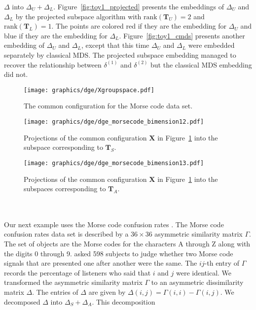 $\Delta$ into $\Delta_U + \Delta_L$. Figure~\ref{fig:toy1_projected}
presents the embeddings of $\Delta_U$ and $\Delta_L$
by the projected subspace algorithm with $\mathrm{rank}(\mathbf{T}_U)
= 2$ and $\mathrm{rank}(\mathbf{T}_L) = 1$. The points are colored red
if they are the embedding for $\Delta_U$ and blue if they are the
embedding for $\Delta_L$. Figure~\ref{fig:toy1_cmds} presents 
another embedding of $\Delta_U$ and $\Delta_L$, except that
this time $\Delta_U$ and $\Delta_L$ were embedded separately by
classical MDS. The projected subspace embedding managed to recover
the relationship between $\delta^{(1)}$ and $\delta^{(2)}$ but the
classical MDS embedding did not.
\begin{figure}[htbp]
  \centering
    \texttt{[image: graphics/dge/Xgroupspace.pdf]}
    \caption{The common configuration for the Morse code
    data set.}
  \label{fig:morsecode3d}
\end{figure}
\begin{figure}[htbp]
  \centering
  \texttt{[image: graphics/dge/dge\_morsecode\_bimension12.pdf]}
  \caption{Projections of the common configuration $\mathbf{X}$ in
    Figure~\ref{fig:morsecode3d} into the subspace corresponding to
    $\mathbf{T}_S$.}
  \label{fig:morsecode2a}
\end{figure}
\begin{figure}
  \centering
  \texttt{[image: graphics/dge/dge\_morsecode\_bimension13.pdf]}
  \caption{Projections of the common configuration $\mathbf{X}$ in
    Figure~\ref{fig:morsecode3d} into the subspaces corresponding to
    $\mathbf{T}_A$. }
  \label{fig:morsecode2b}
\end{figure}
\\ \\ \noindent Our next example uses the Morse code confusion rates
\citep{rothkopf57}. The Morse code confusion rates data set is
described by a $36 \times 36$ asymmetric similarity matrix
$\Gamma$. The set of objects are the Morse codes for the characters A
through Z along with the digits 0 through 9. \citet{rothkopf57} asked
598 subjects to judge whether two Morse code signals that are
presented one after another were the same. The $ij$-th entry of
$\Gamma$ records the percentage of listeners who said that $i$ and $j$
were identical. We transformed the asymmetric similarity matrix
$\Gamma$ to an asymmetric dissimilarity matrix $\Delta$. The entries
of $\Delta$ are given by $\Delta(i,j) = \Gamma(i,i) - \Gamma(i,j)$. We
decomposed $\Delta$ into $\Delta_S + \Delta_{A}$. This decomposition
